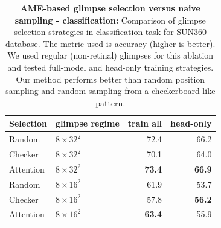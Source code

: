 \begin{table}[t]
\begin{center}
\begin{small}
\begin{sc}
\begin{tabular}{llrr}
\toprule
Selection & glimpse regime & train all & head-only \\
\midrule
Random & $8 \times 32^2$ & 72.4	& 66.2 \\
Checker & $8 \times 32^2$ & 70.1 &64.0 \\
Attention & $8 \times 32^2$ & \textbf{73.4} & \textbf{66.9} \\
\midrule
Random & $8 \times 16^2$ & 61.9	& 53.7\\
Checker & $8 \times 16^2$ & 57.8 & \textbf{56.2} \\
Attention & $8 \times 16^2$ & \textbf{63.4} & 55.9 \\
\bottomrule
\end{tabular}
\end{sc}
\end{small}
\end{center}
\vskip -0.1in
\caption{\textbf{AME-based glimpse selection versus naive sampling - classification:} Comparison of glimpse selection strategies in classification task for SUN360 database. The metric used is accuracy (higher is better). We used regular (non-retinal) glimpses for this ablation and tested full-model and head-only training strategies. Our method performs better than random position sampling and random sampling from a checkerboard-like pattern.}
\label{tab:selection-classification}
\end{table}